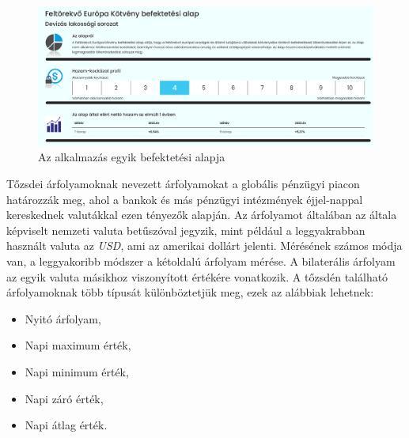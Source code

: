\begin{figure}[h]
\centering
\includegraphics[scale=0.3]{images/europeInvestExample}
\caption{Az alkalmazás egyik befektetési alapja}
\label{fig:europeInvestExample}
\end{figure}


Tőzsdei árfolyamoknak nevezett árfolyamokat a globális pénzügyi piacon határozzák meg, ahol a bankok és más pénzügyi intézmények éjjel-nappal kereskednek valutákkal ezen tényezők alapján. Az árfolyamot általában az általa képviselt nemzeti valuta betűszóval jegyzik, mint például a leggyakrabban használt valuta az \emph{USD}, ami az amerikai dollárt jelenti. Mérésének számos módja van, a  leggyakoribb módszer a kétoldalú árfolyam mérése. A bilaterális árfolyam az egyik valuta másikhoz viszonyított értékére vonatkozik. A tőzsdén található árfolyamoknak több típusát különböztetjük meg, ezek az alábbiak lehetnek: 
\begin{itemize}
\item Nyitó árfolyam,
\item Napi maximum érték,
\item Napi minimum érték,
\item Napi záró érték,
\item Napi átlag érték. \cite{exchangeRate}
\end{itemize}

